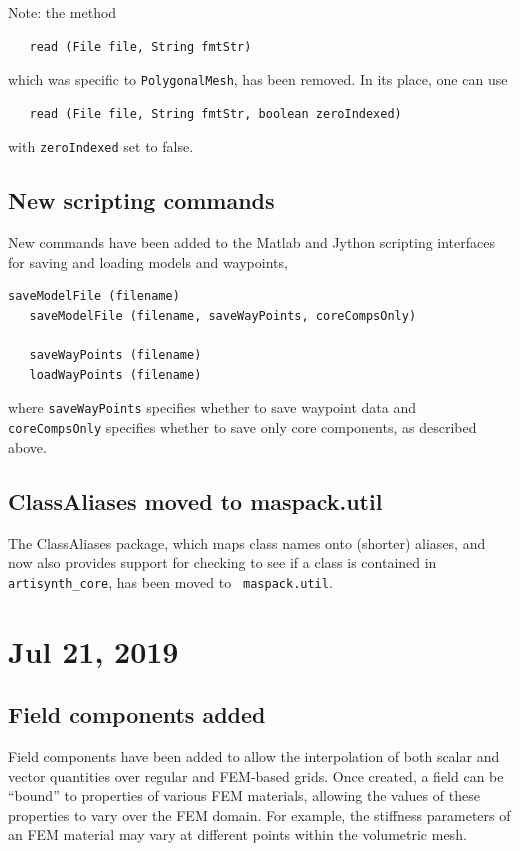 \documentclass{article}
\begin{document}
\begin{sideblock}
Note: the method
\begin{verbatim}
   read (File file, String fmtStr)
\end{verbatim}
which was specific to {\tt PolygonalMesh}, has been removed.
In its place, one can use
\begin{verbatim}
   read (File file, String fmtStr, boolean zeroIndexed)
\end{verbatim}
with {\tt zeroIndexed} set to false.
\end{sideblock}

\subsection*{New scripting commands}

New commands have been added to the Matlab and Jython scripting
interfaces for saving and loading models and waypoints,
%
\begin{lstlisting}[]
   saveModelFile (filename)
   saveModelFile (filename, saveWayPoints, coreCompsOnly)

   saveWayPoints (filename)
   loadWayPoints (filename)
\end{lstlisting}
%
where {\tt saveWayPoints} specifies whether to save waypoint data and
{\tt coreCompsOnly} specifies whether to save only core components, as
described above.

\subsection*{ClassAliases moved to maspack.util}

The ClassAliases package, which maps class names onto (shorter)
aliases, and now also provides support for checking to see if a class
is contained in {\tt artisynth\_core}, has been moved to {\tt
maspack.util}.

\section*{Jul 21, 2019}

\subsection*{Field components added}

Field components have been added to allow the interpolation of both
scalar and vector quantities over regular and FEM-based grids.  Once
created, a field can be ``bound'' to properties of various FEM
materials, allowing the values of these properties to vary over the
FEM domain. For example, the stiffness parameters of an FEM material
may vary at different points within the volumetric mesh.
\end{document}
